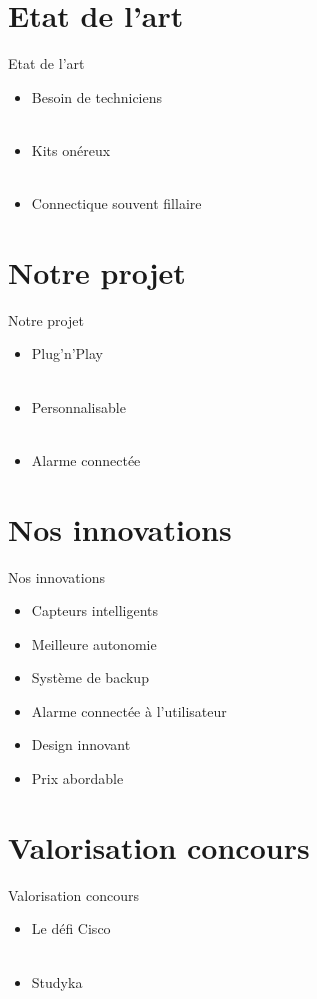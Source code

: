 \section{Etat de l'art}


\begin{frame}{Etat de l'art}{~}
	\begin{itemize}
		\item Besoin de techniciens \pause \\ ~
		\item Kits onéreux \pause \\ ~
		\item Connectique souvent fillaire
	\end{itemize}
\end{frame}

\section{Notre projet}

\begin{frame}{Notre projet}{~}
	\begin{itemize}
		\item Plug'n'Play \pause \\ ~
		\item Personnalisable \pause \\ ~
		\item Alarme connectée
	\end{itemize}
\end{frame}
\section{Nos innovations}

\begin{frame}{Nos innovations}{~}
	\begin{itemize}
		\item Capteurs intelligents \pause
		\item Meilleure autonomie \pause
		\item Système de backup \pause
		\item Alarme connectée à l'utilisateur \pause
		\item Design innovant \pause
		\item Prix abordable
	\end{itemize}
\end{frame}

\section{Valorisation concours}

\begin{frame}{Valorisation concours}{~}
	\Large{\begin{itemize}
		\item Le défi Cisco \pause \\~
		\item Studyka
	\end{itemize}}
\end{frame}


